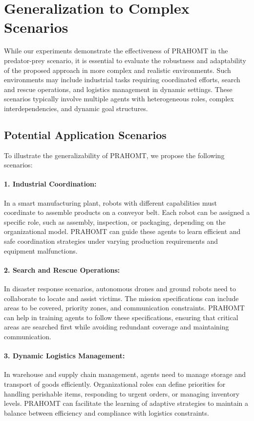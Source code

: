 \documentclass[sigconf,anonymous]{aamas}
\begin{document}
\section{Generalization to Complex Scenarios}
\label{sec:complex_scenarios}

While our experiments demonstrate the effectiveness of PRAHOMT in the predator-prey scenario, it is essential to evaluate the robustness and adaptability of the proposed approach in more complex and realistic environments. Such environments may include industrial tasks requiring coordinated efforts, search and rescue operations, and logistics management in dynamic settings. These scenarios typically involve multiple agents with heterogeneous roles, complex interdependencies, and dynamic goal structures.

\subsection{Potential Application Scenarios}
To illustrate the generalizability of PRAHOMT, we propose the following scenarios:

\paragraph{1. Industrial Coordination:} In a smart manufacturing plant, robots with different capabilities must coordinate to assemble products on a conveyor belt. Each robot can be assigned a specific role, such as assembly, inspection, or packaging, depending on the organizational model. PRAHOMT can guide these agents to learn efficient and safe coordination strategies under varying production requirements and equipment malfunctions.

\paragraph{2. Search and Rescue Operations:} In disaster response scenarios, autonomous drones and ground robots need to collaborate to locate and assist victims. The mission specifications can include areas to be covered, priority zones, and communication constraints. PRAHOMT can help in training agents to follow these specifications, ensuring that critical areas are searched first while avoiding redundant coverage and maintaining communication.

\paragraph{3. Dynamic Logistics Management:} In warehouse and supply chain management, agents need to manage storage and transport of goods efficiently. Organizational roles can define priorities for handling perishable items, responding to urgent orders, or managing inventory levels. PRAHOMT can facilitate the learning of adaptive strategies to maintain a balance between efficiency and compliance with logistics constraints.
\end{document}
